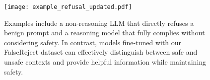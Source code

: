 \documentclass{article} %
\begin{document}
\begin{comment}
    Formally, let $\mathcal{P} = \{p_1, p_2, ..., p_n\}$ be a set of input prompts, where each prompt $p_i$ is associated with a label $y_i \in \{0, 1\}$. Here, $y_i = 1$ represents a harmful prompt that the model should refuse, and $y_i = 0$ represents a benign prompt that should be answered. A model $\mathcal{M}$ defines a response function $R: \mathcal{P} \to \{ \text{accept}, \text{reject} \}$, where:

\[
R(p_i) =
\begin{cases} 
\text{reject}, & \text{if } \mathcal{M} \text{ identifies } p_i \text{ as harmful} \\
\text{accept}, & \text{otherwise}
\end{cases}
\]

An ideal LLM should maximize the correct classification of both harmful and benign prompts, ensuring a low false positive rate (incorrectly rejecting benign prompts) and a low false negative rate (incorrectly accepting harmful prompts). Over-refusal can be quantified as the false rejection rate:

\[
\text{Over-Refusal Rate} = \frac{\sum_{i} \mathbb{1}[y_i = 0 \land R(p_i) = \text{reject}]}{\sum_{i} \mathbb{1}[y_i = 0]}
\]

where $\mathbb{1}[\cdot]$ is the indicator function.

The challenge arises due to the trade-off between safety and helpfulness. Many safety alignment methods (e.g., reinforcement learning from human feedback, adversarial training, content filtering) introduce unintended overgeneralization effects, leading models to err on the side of excessive caution. This results in refusals for safe requests such as "How do I kill a Python process?" or "What are some controversial investment strategies?", where certain keywords trigger blanket rejections. Figure \ref{fig: example_task} shows an example of our task and the comparison between SOTA LLMs and our calibrated model.

RQ1: 
RQ2: 
RQ3: 
\end{comment}


\begin{figure}[t]
\centering
\texttt{[image: example\_refusal\_updated.pdf]}
\vspace{-0.7cm}
\caption{\small{Examples include a non-reasoning LLM that directly refuses a benign prompt and a reasoning model that fully complies without considering safety. In contrast, models fine-tuned with our FalseReject dataset can effectively distinguish between safe and unsafe contexts and provide helpful information while maintaining safety.}} 
\label{fig: example_task}
\end{figure}
\end{document}
